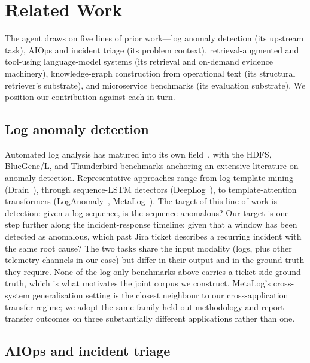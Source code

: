 
\section{Related Work}
\label{sec:related}

The agent draws on five lines of prior work---log anomaly detection (its upstream task), AIOps and incident triage (its problem context), retrieval-augmented and tool-using language-model systems (its retrieval and on-demand evidence machinery), knowledge-graph construction from operational text (its structural retriever's substrate), and microservice benchmarks (its evaluation substrate). We position our contribution against each in turn.

\subsection{Log anomaly detection}
\label{sec:related:logs}

Automated log analysis has matured into its own field~\cite{loganalysis-survey}, with the HDFS, BlueGene/L, and Thunderbird benchmarks anchoring an extensive literature on anomaly detection. Representative approaches range from log-template mining (Drain~\cite{drain}), through sequence-LSTM detectors (DeepLog~\cite{deeplog}), to template-attention transformers (LogAnomaly~\cite{loganomaly}, MetaLog~\cite{metalog}). The target of this line of work is detection: given a log sequence, is the sequence anomalous? Our target is one step further along the incident-response timeline: given that a window has been detected as anomalous, which past Jira ticket describes a recurring incident with the same root cause? The two tasks share the input modality (logs, plus other telemetry channels in our case) but differ in their output and in the ground truth they require. None of the log-only benchmarks above carries a ticket-side ground truth, which is what motivates the joint corpus we construct. MetaLog's cross-system generalisation setting is the closest neighbour to our cross-application transfer regime; we adopt the same family-held-out methodology and report transfer outcomes on three substantially different applications rather than one.

\subsection{AIOps and incident triage}
\label{sec:related:aiops}

